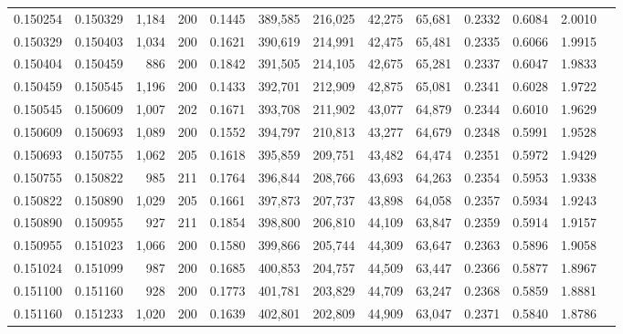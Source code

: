 \begin{tabular}{rrrrrrrrrrrrr}
0.150254 & 0.150329 & 1,184 & 200 &                                     0.1445 & 389,585 & 216,025 &  42,275 &  65,681 & 0.2332 & 0.6084 & 2.0010 \\
0.150329 & 0.150403 & 1,034 & 200 &                                     0.1621 & 390,619 & 214,991 &  42,475 &  65,481 & 0.2335 & 0.6066 & 1.9915 \\
0.150404 & 0.150459 &   886 & 200 &                                     0.1842 & 391,505 & 214,105 &  42,675 &  65,281 & 0.2337 & 0.6047 & 1.9833 \\
0.150459 & 0.150545 & 1,196 & 200 &                                     0.1433 & 392,701 & 212,909 &  42,875 &  65,081 & 0.2341 & 0.6028 & 1.9722 \\
0.150545 & 0.150609 & 1,007 & 202 &                                     0.1671 & 393,708 & 211,902 &  43,077 &  64,879 & 0.2344 & 0.6010 & 1.9629 \\
0.150609 & 0.150693 & 1,089 & 200 &                                     0.1552 & 394,797 & 210,813 &  43,277 &  64,679 & 0.2348 & 0.5991 & 1.9528 \\
0.150693 & 0.150755 & 1,062 & 205 &                                     0.1618 & 395,859 & 209,751 &  43,482 &  64,474 & 0.2351 & 0.5972 & 1.9429 \\
0.150755 & 0.150822 &   985 & 211 &                                     0.1764 & 396,844 & 208,766 &  43,693 &  64,263 & 0.2354 & 0.5953 & 1.9338 \\
0.150822 & 0.150890 & 1,029 & 205 &                                     0.1661 & 397,873 & 207,737 &  43,898 &  64,058 & 0.2357 & 0.5934 & 1.9243 \\
0.150890 & 0.150955 &   927 & 211 &                                     0.1854 & 398,800 & 206,810 &  44,109 &  63,847 & 0.2359 & 0.5914 & 1.9157 \\
0.150955 & 0.151023 & 1,066 & 200 &                                     0.1580 & 399,866 & 205,744 &  44,309 &  63,647 & 0.2363 & 0.5896 & 1.9058 \\
0.151024 & 0.151099 &   987 & 200 &                                     0.1685 & 400,853 & 204,757 &  44,509 &  63,447 & 0.2366 & 0.5877 & 1.8967 \\
0.151100 & 0.151160 &   928 & 200 &                                     0.1773 & 401,781 & 203,829 &  44,709 &  63,247 & 0.2368 & 0.5859 & 1.8881 \\
0.151160 & 0.151233 & 1,020 & 200 &                                     0.1639 & 402,801 & 202,809 &  44,909 &  63,047 & 0.2371 & 0.5840 & 1.8786 \\

\end{tabular}
